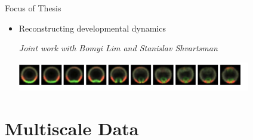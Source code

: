 \documentclass[12pt]{beamer}
\newcommand{\newfootnote}[1]{\let\thefootnote\relax\footnotetext{#1}}
\begin{document}
\begin{frame}{Focus of Thesis}
\begin{itemize}
\begin{tikzpicture}

\end{tikzpicture}

\item Reconstructing developmental dynamics \\
{\scriptsize \em Joint work with Bomyi Lim and Stanislav Shvartsman \par}


\includegraphics[width=0.8\textwidth]{drosophila_data_averaged}

\end{itemize}

\end{frame}

\section{Multiscale Data}

%
%
%
%
%
%
%
%
%
%
\end{document}
